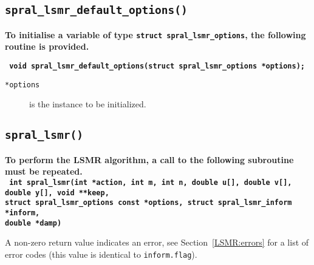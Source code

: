 \subsection{\texttt{spral\_lsmr\_default\_options()}}
\textbf{To initialise a variable of type \texttt{struct spral\_lsmr\_options},
the following routine is provided.}

\vspace*{0.1cm}
\noindent
\textbf{\texttt{
   \hspace*{0.3cm} void spral\_lsmr\_default\_options(struct spral\_lsmr\_options *options);
}}

\noindent
\begin{description}
   \item[\texttt{*options}] is the instance to be initialized.
\end{description}

\subsection{\texttt{spral\_lsmr()}}
\textbf{
   To perform the LSMR algorithm, a call to the following subroutine must be
   repeated.
   \vspace{0.2cm}\\
   \texttt{
      \hspace*{0.2cm} int spral\_lsmr(int *action, int m, int n, double u[], double v[], double y[], void **keep,\\
      \hspace*{0.7cm} struct spral\_lsmr\_options const *options, struct spral\_lsmr\_inform *inform,\\
      \hspace*{0.7cm} double *damp)
   }
}

\vspace{0.1cm}
\noindent
A non-zero return value indicates an error, see Section~\ref{LSMR:errors} for a
list of error codes (this value is identical to \texttt{inform.flag}).

